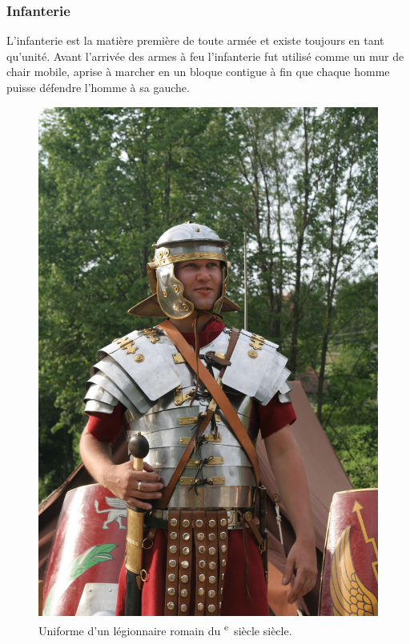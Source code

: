 \documentclass{article}
\newcommand{\cRM}[1]{\MakeUppercase{\romannumeral #1}}  %
\newcommand{\siecle}[1]{\cRM{#1}\textsuperscript{e}~siècle}
\begin{document}
\subsubsection{Infanterie}
L'infanterie est la matière première de toute armée et existe toujours en tant qu'unité. Avant l'arrivée des armes à feu l'infanterie fut utilisé comme un mur de chair mobile, aprise à marcher en un bloque contigue à fin que chaque homme puisse défendre l'homme à sa gauche.

\begin{center}
\begin{figure}[H]
\hfill
\begin{minipage}[H]{0.3\linewidth}
	\centering
	\includegraphics[width=\linewidth]{../ressources/Roman_soldier}
	\caption{Uniforme d'un légionnaire romain du \siecle{1} siècle. \cite{infantery}}

\end{minipage}
\end{figure}
\end{center}
\end{document}
